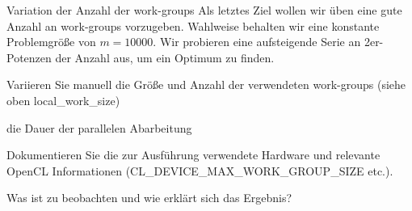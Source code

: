 \documentclass[
ngerman,
subtask=ruled %
]{tudaexercise}
\begin{document}
	\begin{task} {Variation der Anzahl der work-groups}
		Als letztes Ziel wollen wir üben eine gute Anzahl an work-groups vorzugeben. Wahlweise behalten wir eine konstante Problemgröße von $m = 10000$.
		Wir probieren eine aufsteigende Serie an 2er-Potenzen der Anzahl aus, um ein Optimum zu finden.
		
		Variieren Sie manuell die Größe und Anzahl der verwendeten work-groups (siehe oben local\_work\_size) 
		
		die Dauer der parallelen Abarbeitung
		
		Dokumentieren Sie die zur Ausführung verwendete Hardware und relevante OpenCL Informationen (CL\_DEVICE\_MAX\_WORK\_GROUP\_SIZE etc.).
		
		Was ist zu beobachten und wie erklärt sich das Ergebnis?
		
		
	\end{task}

	
\end{document}
